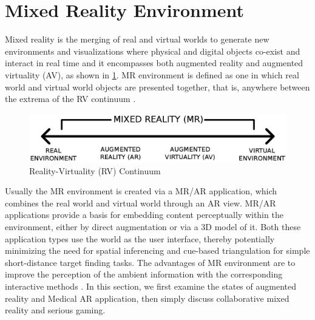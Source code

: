 \section{Mixed Reality Environment}
Mixed reality is the merging of real and virtual worlds to generate new environments and visualizations where physical and digital objects co-exist and interact in real time%
and it encompasses both augmented reality and augmented virtuality (AV), as shown in \figurename{\ref{fig:2-bg:Reality-Virtuality_Continuum}}. MR environment is defined as one in which real world and virtual world objects are presented together, that is, anywhere between the extrema of the RV continuum \cite{Milgram1994a}. 
\begin{figure}
	\centering
	\includegraphics[width=0.8\linewidth]{figures/2-bg/Reality-Virtuality_Continuum}
	\caption{Reality-Virtuality (RV) Continuum}
	\label{fig:2-bg:Reality-Virtuality_Continuum}
\end{figure}
Usually the MR environment is created via a MR/AR application, which combines the real world and virtual world through an AR view.
MR/AR applications provide a basis for embedding content perceptually within the environment, either by direct augmentation or via a 3D model of it. Both these application types use the world as the user interface, thereby potentially minimizing the need for spatial inferencing and cue-based triangulation for simple short-distance target finding tasks. The advantages of MR environment are to improve the perception of the ambient information with the corresponding interactive methods \cite{Nurminen}. In this section, we first examine the states of augmented reality and Medical AR application, then simply discuss collaborative mixed reality and serious gaming.

